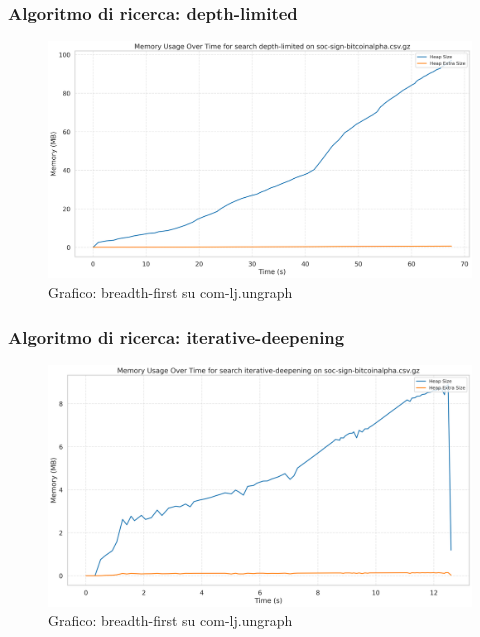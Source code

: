 \documentclass{article}
\begin{document}
\subsubsection{Algoritmo di ricerca: depth-limited}
\begin{figure}[h]\centering
\includegraphics[width=\textwidth]{../plots/soc-sign-bitcoinalpha.csv_depth-limited.png}
\caption{Grafico: breadth-first su com-lj.ungraph}
\end{figure}
\subsubsection{Algoritmo di ricerca: iterative-deepening}
\begin{figure}[h]\centering
\includegraphics[width=\textwidth]{../plots/soc-sign-bitcoinalpha.csv_iterative-deepening.png}
\caption{Grafico: breadth-first su com-lj.ungraph}
\end{figure}
\end{document}

